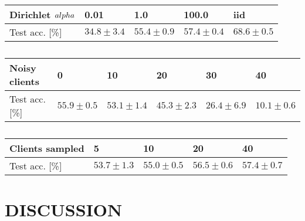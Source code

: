 \documentclass{article}
\begin{document}
\begin{table}
        \small
        \begin{center}
                \begin{tabular}{l l l l l}
                        Dirichlet $\\alpha$ & 0.01 & 1.0 & 100.0 & iid \\
                        \hline
                        Test acc. [\%] & $34.8 \pm 3.4$ & $55.4 \pm 0.9$ & $57.4 \pm 0.4$ & $68.6 \pm 0.5$ \\
                \end{tabular}
        \end{center}
        \caption{}
        \label{tab:alpha}
\end{table}
\begin{table}
        \footnotesize
        \begin{center}
                \begin{tabular}{l l l l l l}
                        Noisy clients & 0 & 10 & 20 & 30 & 40 \\
                        \hline
                        Test acc. [\%] & $55.9 \pm 0.5$ & $53.1 \pm 1.4$ & $45.3 \pm 2.3$ & $26.4 \pm 6.9$ & $10.1 \pm 0.6$ \\
                \end{tabular}
        \end{center}
        \caption{}
        \label{tab:noisy_clients}
\end{table}
\begin{table}
        \small
        \begin{center}
                \begin{tabular}{l l l l l}
                        Clients sampled & 5 & 10 & 20 & 40 \\
                        \hline
                        Test acc. [\%] & $53.7 \pm 1.3$ & $55.0 \pm 0.5$ & $56.5 \pm 0.6$ & $57.4 \pm 0.7$ \\
                \end{tabular}
        \end{center}
        \caption{}
        \label{tab:clients_per_round}
\end{table}

\section{DISCUSSION}%
\label{sec:discussion}

\vfill
\pagebreak



\end{document}

